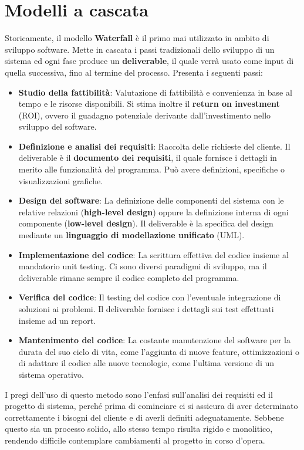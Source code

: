 \section{Modelli a cascata}
Storicamente, il modello \textbf{Waterfall} è il primo mai utilizzato in ambito di sviluppo software. Mette in cascata i passi tradizionali dello sviluppo di un sistema ed ogni fase produce un \textbf{deliverable}, il quale verrà usato come input di quella successiva, fino al termine del processo. Presenta i seguenti passi: \begin{itemize}
	\item \textbf{Studio della fattibilità}: Valutazione di fattibilità e convenienza in base al tempo e le risorse disponibili. Si stima inoltre il \textbf{return on investment} (ROI), ovvero il guadagno potenziale derivante dall'investimento nello sviluppo del software.
	\item \textbf{Definizione e analisi dei requisiti}: Raccolta delle richieste del cliente. Il deliverable è il \textbf{documento dei requisiti}, il quale fornisce i dettagli in merito alle funzionalità del programma. Può avere definizioni, specifiche o visualizzazioni grafiche.
	\item \textbf{Design del software}: La definizione delle componenti del sistema con le relative relazioni (\textbf{high-level design}) oppure la definizione interna di ogni componente (\textbf{low-level design}). Il deliverable è la specifica del design mediante un \textbf{linguaggio di modellazione unificato} (UML).
	\item \textbf{Implementazione del codice}: La scrittura effettiva del codice insieme al mandatorio unit testing. Ci sono diversi paradigmi di sviluppo, ma il deliverable rimane sempre il codice completo del programma.
	\item \textbf{Verifica del codice}: Il testing del codice con l'eventuale integrazione di soluzioni ai problemi. Il deliverable fornisce i dettagli sui test effettuati insieme ad un report.
	\item \textbf{Mantenimento del codice}: La costante manutenzione del software per la durata del suo ciclo di vita, come l'aggiunta di nuove feature, ottimizzazioni o di adattare il codice alle nuove tecnologie, come l'ultima versione di un sistema operativo.
\end{itemize}
\noindent I pregi dell'uso di questo metodo sono l'enfasi sull'analisi dei requisiti ed il progetto di sistema, perché prima di cominciare ci si assicura di aver determinato correttamente i bisogni del cliente e di averli definiti adeguatamente. Sebbene questo sia un processo solido, allo stesso tempo risulta rigido e monolitico, rendendo difficile contemplare cambiamenti al progetto in corso d'opera.\par
